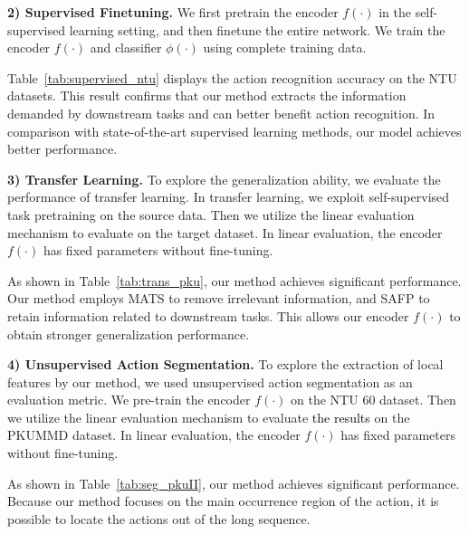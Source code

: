 \documentclass[twocolumn]{article}
\newcommand{\wh}[1]{\textcolor{black}{#1}}
\begin{document}
\vspace{1mm}


\noindent\textbf{2) Supervised Finetuning.}
We first pretrain the encoder $f(\cdot)$ in the self-supervised learning setting, and then finetune the entire network. We train the encoder $f(\cdot)$ and classifier $\phi(\cdot)$ using complete training data.

Table~\ref{tab:supervised_ntu} displays the action recognition accuracy on the NTU datasets. This result confirms that our method extracts the information demanded by downstream tasks and can better benefit action recognition. 
In comparison with state-of-the-art supervised learning methods, our model achieves better performance.

\vspace{1mm}









\vspace{1mm}

\noindent\textbf{3) Transfer Learning.} 
To explore the generalization ability, we evaluate the performance of transfer learning. In transfer learning, we exploit self-supervised task pretraining on the source data. Then we utilize the linear evaluation mechanism to evaluate on the target dataset. In linear evaluation, the encoder $f(\cdot)$ has fixed parameters without fine-tuning.

As shown in Table~\ref{tab:trans_pku}, our method achieves significant performance. Our method employs MATS to remove irrelevant information, and SAFP to retain information related to downstream tasks. This allows our encoder $f(\cdot)$ to obtain stronger generalization performance.

\vspace{1mm}

\noindent\textbf{4) Unsupervised Action Segmentation.} 
To explore the extraction of local features by our method, we used unsupervised action segmentation as an evaluation metric. We pre-train the encoder $f(\cdot)$ on the NTU 60 dataset. Then we utilize the linear evaluation mechanism to evaluate \wh{the results} on the PKUMMD dataset. In linear evaluation, the encoder $f(\cdot)$ has fixed parameters without fine-tuning.

As shown in Table~\ref{tab:seg_pkuII}, our method achieves significant performance. Because our method focuses on the main occurrence region of the action, it is possible to locate the actions out of the long sequence.
\end{document}
